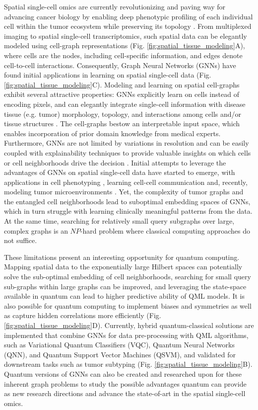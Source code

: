 \documentclass{article}
\begin{document}
Spatial single-cell omics are currently revolutionizing and paving way for advancing cancer biology by enabling deep phenotypic profiling of each individual cell within the tumor ecosystem while preserving its topology \cite{lewis2021spatial}. 
From multiplexed imaging to spatial single-cell transcriptomics, such spatial data can be elegantly modeled using cell-graph representations (Fig. \ref{fig:spatial_tissue_modeling}A), where cells are the nodes, including cell-specific information, and edges denote cell-to-cell interactions.
Consequently, Graph Neural Networks (GNNs) have found initial applications in learning on spatial single-cell data (Fig. \ref{fig:spatial_tissue_modeling}C).
Modeling and learning on spatial cell-graphs exhibit several attractive properties: GNNs explicitly learn on cells instead of encoding pixels, and can elegantly integrate single-cell information with disease tissue (e.g. tumor) morphology, topology, and interactions among cells and/or tissue structures \cite{hetzel2021graph, li2022graph}. The cell-graphs bestow an interpretable input space, which enables incorporation of prior domain knowledge from medical experts. 
Furthermore, GNNs are not limited by variations in resolution and can be easily coupled with explainability techniques to provide valuable insights on which cells or cell neighborhoods drive the decision \cite{jaume2021quantifying}. 
Initial attempts to leverage the advantages of GNNs on spatial single-cell data have started to emerge, with applications in cell phenotyping \cite{brbic2022annotation}, learning cell-cell communication \cite{fischer2022modeling, yuan2020gcng} and, recently, modeling tumor microenvironments \cite{wu2022graph}. Yet, the complexity of tumor graphs and the entangled cell neighborhoods lead to suboptimal embedding spaces of GNNs, which in turn struggle with learning clinically meaningful patterns from the data. At the same time, searching for relatively small query subgraphs over large, complex graphs is an $NP$-hard problem where classical computing approaches do not suffice. 

These limitations present an interesting opportunity for quantum computing. Mapping spatial data to the exponentially large Hilbert spaces can potentially solve the sub-optimal embedding of cell neighborhoods, searching for small query sub-graphs within large graphs can be improved, and leveraging the state-space available in quantum can lead to higher predictive ability of QML models. It is also possible for quantum computing to implement biases and symmetries as well as capture hidden correlations more efficiently (Fig.  \ref{fig:spatial_tissue_modeling}D). 
Currently, hybrid quantum-classical solutions are implemented that combine GNNs for data pre-processing with QML algorithms, such as Variational Quantum Classifiers (VQC), Quantum Neural Networks (QNN), and Quantum Support Vector Machines (QSVM), and validated for downstream tasks such as tumor subtyping \cite{brancati2022bracs,bulten2022}  (Fig. \ref{fig:spatial_tissue_modeling}B). 
Quantum versions of GNNs can also be created and researched upon for these inherent graph problems to study the possible advantages quantum can provide as new research directions and advance the state-of-art in the spatial single-cell omics. 
\end{document}
